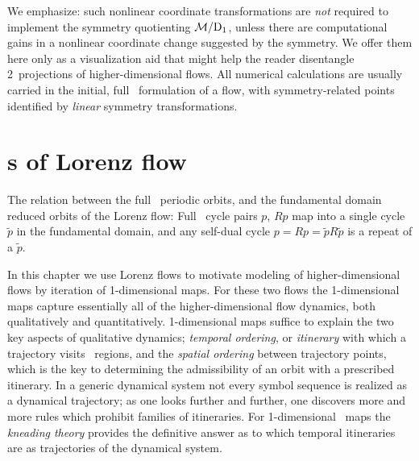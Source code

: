 We emphasize: such nonlinear coordinate transformations are
\emph{not} required to implement the symmetry quotienting
${\cal M}/\mathrm{D}_1$, unless there are computational gains in a nonlinear
coordinate change suggested by the symmetry. We offer them here
only as a visualization aid that might help the reader
disentangle 2\dmn\ projections of higher-dimensional flows. All
numerical calculations are usually carried in the initial, full
\statesp\ formulation of a flow, with symmetry-related points
identified by \emph{linear} symmetry transformations.


\section{\Po s of Lorenz flow}\label{exmp:LorenzRpos}
%
The relation between the full \statesp\ periodic orbits,
and the fundamental domain  reduced orbits
of the Lorenz flow:
Full \statesp\ cycle pairs $p$, $Rp$ map into
a single cycle $\tilde{p}$ in the fundamental domain, and any
self-dual cycle $p = Rp = \tilde{p}R\tilde{p}$
is a repeat of a  $\tilde{p}$.



In this chapter we use Lorenz flows to motivate modeling of
higher-dimensional flows by iteration of 1-dimensional maps.
For these two flows the 1-dimensional maps capture essentially
all of the higher-dimensional flow dynamics, both qualitatively
and quantitatively. 1-dimensional maps suffice to explain the
two key aspects of qualitative dynamics; \emph{temporal
ordering}, or \emph{itinerary} with which a trajectory visits
\statesp\ regions, and the \emph{spatial ordering} between
trajectory points, which is the key to determining the
admissibility of an orbit with a prescribed itinerary. In a
generic dynamical system not every symbol sequence is realized
as a dynamical trajectory; as one looks further and further,
one discovers more and more rules which prohibit families of
itineraries. For 1-dimensional \stretchf\ maps the
\emph{kneading theory} provides the definitive answer as to
which temporal itineraries are {\em \admissible} as
trajectories of the dynamical system.


